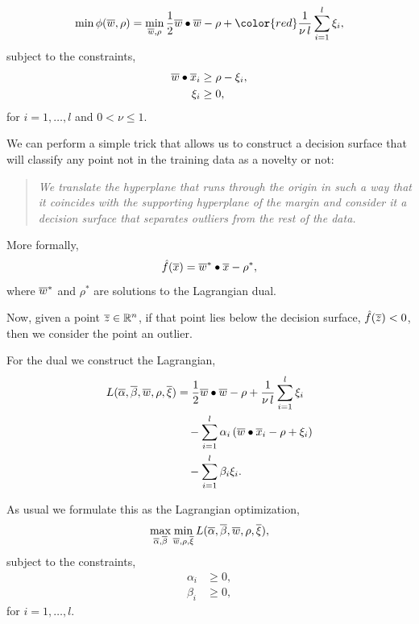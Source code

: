 \documentclass[a4paper,blends,pdf,colorBG,slideColor]{prosper}
\begin{document}
\begin{equation*}
\min \phi(\ol{w},\rho) = \min_{\ol{w},\rho} \frac{1}{2} \ol{w}\bullet\ol{w} - \rho + {\color{red}\frac{1}{\nu\, l}}\sum_{i = 1}^l \xi_i,
\end{equation*}
subject to the constraints,
\begin{align*}
\overline{w}\bullet\overline{x}_i &\ge \rho - \xi_i,\\
\xi_i &\ge 0,
\end{align*}
for $i = 1,\ldots,l$ and $0 < \nu \le 1$. 
\es

We can perform a simple trick  that allows us to construct a decision surface that will classify any point not in the training data
as a novelty or not:  
\begin{quote}
\em We translate the hyperplane that runs
through the origin in such a way that it coincides with the supporting hyperplane of the margin and
consider it a decision surface that separates outliers from the rest of the data.
\end{quote}
More formally,
\begin{equation*}
\hat{f}(\overline{x}) = \overline{w}^*\bullet\overline{x} - \rho^*,
\end{equation*}
where $\overline{w}^*$ and $\rho^*$ are solutions to the Lagrangian dual.

Now, given a point $\overline{z}\in \mathbb{R}^{n}$, if that point lies below the decision surface, $\hat{f}(\overline{z}) < 0$, then we consider the point an outlier.

\es


\small
For the dual we construct the Lagrangian,
\begin{equation*}
\begin{aligned}
L(\overline{\alpha},\overline{\beta},\overline{w},\rho,\overline{\xi}) &=\frac{1}{2} \overline{w}\bullet\overline{w} - \rho + \frac{1}{\nu\, l}\sum_{i = 1}^l \xi_i\\
&\quad - \sum_{i=1}^l \alpha_i\left(\overline{w}\bullet\overline{x}_i - \rho + \xi_i\right)\\
&\quad - \sum_{i=1}^l \beta_i\xi_i.
\end{aligned}
\end{equation*}

As usual we formulate this as the Lagrangian optimization,
\begin{equation*}
\max_{\overline{\alpha},\overline{\beta}} \min_{\overline{w},\rho,\overline{\xi}} L(\overline{\alpha},\overline{\beta},\overline{w},\rho,\overline{\xi}),
\end{equation*}
subject to the constraints,
\begin{align*}
\alpha_i &\ge 0,\\
\beta_i &\ge 0,
\end{align*}
for $i = 1,\ldots,l$. 
\es
\end{document}
